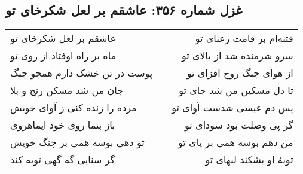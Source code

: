 \begin{center}
\section*{غزل شماره ۳۵۶: عاشقم بر لعل شکرخای تو}
\label{sec:356}
\begin{longtable}{l p{0.5cm} r}
عاشقم بر لعل شکرخای تو
&&
فتنه‌ام بر قامت رعنای تو
\\
ماه بر راه اوفتاد از روی تو
&&
سرو شرمنده شد از بالای تو
\\
پوست در تن خشک دارم همچو چنگ
&&
از هوای چنگ روح افزای تو
\\
جان من شد مسکن رنج و بلا
&&
تا دل مسکین من شد جای تو
\\
مرده را زنده کنی ز آوای خویش
&&
پس دم عیسی شدست آوای تو
\\
باز بنما روی خود ایماهروی
&&
گر پی وصلت بود سودای تو
\\
تو دهی بوسه همی بر چنگ خویش
&&
من دهم بوسه همی بر پای تو
\\
گر سنایی گه گهی توبه کند
&&
توبهٔ او بشکند لبهای تو
\\
\end{longtable}
\end{center}
